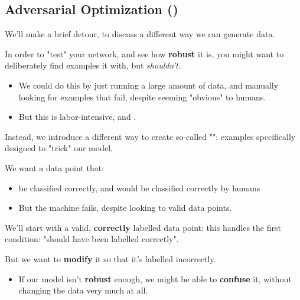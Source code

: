     \pagebreak


            

            

    \subsection{Adversarial Optimization ()}

        We'll make a brief detour, to discuss a different way we can generate  data.

        In order to "test" your network, and see how \textbf{robust} it is, you might want to deliberately find examples it  with, but \textit{shouldn't}.

        \begin{itemize}
            \item We could do this by just running a large amount of data, and manually looking for examples that fail, despite seeming "obvious" to humans.
            \item But this is labor-intensive, and .
        \end{itemize}

        Instead, we introduce a different way to create so-called "": examples specifically designed to "trick" our model.

        We want a data point that:

        \begin{itemize}
            \item {} be classified correctly, and would be classified correctly by humans
            \item But the machine fails, despite looking  to valid data points.
        \end{itemize}

        \subsecdiv

        We'll start with a valid, \textbf{correctly} labelled data point: this handles the first condition: "should have been labelled correctly".

        But we want to \textbf{modify} it so that it's labelled incorrectly.
        
        \begin{itemize}
            \item If our model isn't \textbf{robust} enough, we might be able to \textbf{confuse} it, without changing the data very much at all.
        \end{itemize}

